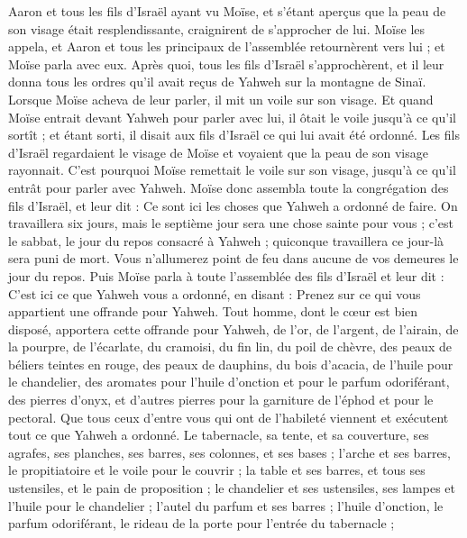 \begin{multicols}{2}
Aaron et tous les fils d'Israël ayant vu Moïse, et s'étant aperçus que la peau de son visage était resplendissante, craignirent de s’approcher de lui.
Moïse les appela, et Aaron et tous les principaux de l'assemblée retournèrent vers lui ; et Moïse parla avec eux.
Après quoi, tous les fils d'Israël s'approchèrent, et il leur donna tous les ordres qu’il avait reçus de Yahweh sur la montagne de Sinaï.
Lorsque Moïse acheva de leur parler, il mit un voile sur son visage.
Et quand Moïse entrait devant Yahweh pour parler avec lui, il ôtait le voile jusqu’à ce qu'il sortît ; et étant sorti, il disait aux fils d'Israël ce qui lui avait été ordonné.
Les fils d'Israël regardaient le visage de Moïse et voyaient que la peau de son visage rayonnait. C'est pourquoi Moïse remettait le voile sur son visage, jusqu’à ce qu'il entrât pour parler avec Yahweh.
\VerseOne{}Moïse donc assembla toute la congrégation des fils d'Israël, et leur dit : Ce sont ici les choses que Yahweh a ordonné de faire.
On travaillera six jours, mais le septième jour sera une chose sainte pour vous ; c'est le sabbat, le jour du repos consacré à Yahweh ; quiconque travaillera ce jour-là sera puni de mort.
Vous n'allumerez point de feu dans aucune de vos demeures le jour du repos.
Puis Moïse parla à toute l'assemblée des fils d'Israël et leur dit : C'est ici ce que Yahweh vous a ordonné, en disant :
Prenez sur ce qui vous appartient une offrande pour Yahweh. Tout homme, dont le cœur est bien disposé, apportera cette offrande pour Yahweh, de l'or, de l'argent, de l'airain\FTNT{},
de la pourpre, de l'écarlate, du cramoisi, du fin lin, du poil de chèvre,
des peaux de béliers teintes en rouge, des peaux de dauphins, du bois d’acacia,
de l'huile pour le chandelier, des aromates pour l'huile d'onction et pour le parfum odoriférant,
des pierres d'onyx, et d’autres pierres pour la garniture de l'éphod et pour le pectoral.
Que tous ceux d’entre vous qui ont de l’habileté viennent et exécutent tout ce que Yahweh a ordonné.
Le tabernacle, sa tente, et sa couverture, ses agrafes, ses planches, ses barres, ses colonnes, et ses bases ;
l'arche et ses barres, le propitiatoire et le voile pour le couvrir ;
la table et ses barres, et tous ses ustensiles, et le pain de proposition ;
le chandelier et ses ustensiles, ses lampes et l'huile pour le chandelier ;
l'autel du parfum et ses barres ; l'huile d'onction, le parfum odoriférant, le rideau de la porte pour l'entrée du tabernacle ;

\end{multicols}

